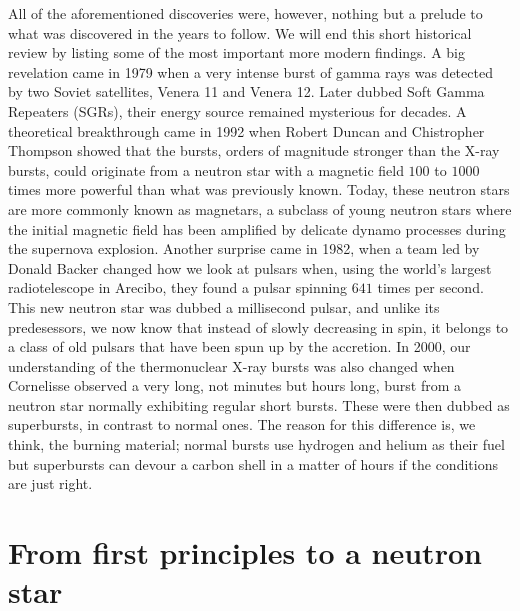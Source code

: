 All of the aforementioned discoveries were, however, nothing but a prelude to what was discovered in the years to follow.
We will end this short historical review by listing some of the most important more modern findings.
A big revelation came in 1979 when a very intense burst of gamma rays was detected by two Soviet satellites, Venera 11 and Venera 12.\cite{MGI79}
Later dubbed Soft Gamma Repeaters (SGRs), their energy source remained mysterious for decades.
A theoretical breakthrough came in 1992 when Robert Duncan and Chistropher Thompson showed that the bursts, orders of magnitude stronger than the X-ray bursts, could originate from a neutron star with a magnetic field $100$ to $1000$ times more powerful than what was previously known.\cite{DT92}
Today, these neutron stars are more commonly known as magnetars, a subclass of young neutron stars where the initial magnetic field has been amplified by delicate dynamo processes during the supernova explosion.
Another surprise came in 1982, when a team led by Donald Backer changed how we look at pulsars when, using the world's largest radiotelescope in Arecibo, they found a pulsar spinning $641$ times per second.\cite{BKH82}
This new neutron star was dubbed a millisecond pulsar, and unlike its predesessors, we now know that instead of slowly decreasing in spin, it belongs to a class of old pulsars that have been spun up by the accretion.
In 2000, our understanding of the thermonuclear X-ray bursts was also changed when Cornelisse observed a very long, not minutes but hours long, burst from a neutron star normally exhibiting regular short bursts.\cite{CHK00}
These were then dubbed as superbursts, in contrast to normal ones.
The reason for this difference is, we think, the burning material;
normal bursts use hydrogen and helium as their fuel but superbursts can devour a carbon shell in a matter of hours if the conditions are just right.



\section{From first principles to a neutron star}

